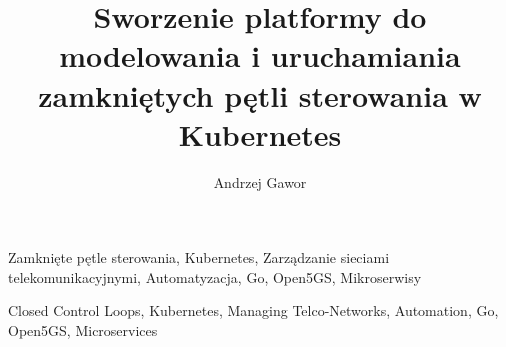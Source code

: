 \documentclass[
    bindingoffset=5mm,  %
    footnoteindent=3mm, %
    hyphenation=true    %
]{src/wut-thesis}
\begin{document}
\title{
    Sworzenie platformy do modelowania i uruchamiania zamkniętych pętli sterowania w Kubernetes
}
\author{Andrzej Gawor}
\date{\the\year}
\maketitle

\cleardoublepage
\abstract

\keywords Zamknięte pętle sterowania, Kubernetes, Zarządzanie sieciami telekomunikacyjnymi, Automatyzacja, Go, Open5GS, Mikroserwisy

\clearpage
\secondabstract

\secondkeywords Closed Control Loops, Kubernetes, Managing Telco-Networks, Automation, Go, Open5GS, Microservices

\pagestyle{plain}

\cleardoublepage
\tableofcontents

\cleardoublepage 
\pagestyle{headings}

 

\cleardoublepage 
\printbibliography
\clearpage



\newpage
\pagestyle{plain}


\listoffigurestoc    
\vspace{1cm}         
\listoftablestoc     
\vspace{1cm}         
\listofappendicestoc 


\end{document}
